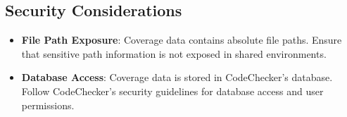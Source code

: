 \subsection{Security Considerations}

\begin{itemize}
    \item \textbf{File Path Exposure}: Coverage data contains absolute file paths. Ensure that sensitive path information is not exposed in shared environments.
    \item \textbf{Database Access}: Coverage data is stored in CodeChecker's database. Follow CodeChecker's security guidelines for database access and user permissions.
\end{itemize}
